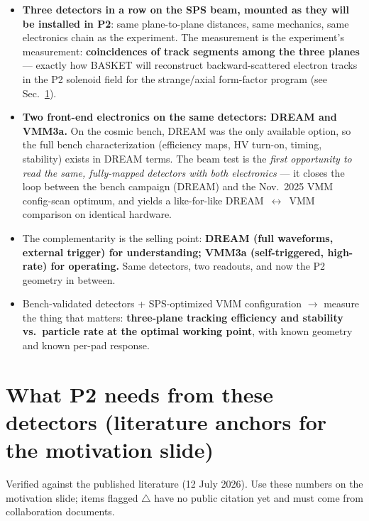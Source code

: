 \documentclass[11pt,a4paper]{article}
\begin{document}
\begin{itemize}[itemsep=2pt]
  \item \textbf{Three detectors in a row on the SPS beam, mounted as they will
    be installed in P2}: same plane-to-plane distances, same mechanics, same
    electronics chain as the experiment. The measurement is the experiment's
    measurement: \textbf{coincidences of track segments among the three
    planes} --- exactly how BASKET will reconstruct backward-scattered
    electron tracks in the P2 solenoid field for the strange/axial
    form-factor program (see Sec.~\ref{sec:p2needs}).
  \item \textbf{Two front-end electronics on the same detectors: DREAM and
    VMM3a.} On the cosmic bench, DREAM was the only available option, so the
    full bench characterization (efficiency maps, HV turn-on, timing,
    stability) exists in DREAM terms. The beam test is the \emph{first
    opportunity to read the same, fully-mapped detectors with both
    electronics} --- it closes the loop between the bench campaign (DREAM) and
    the Nov.\ 2025 VMM config-scan optimum, and yields a like-for-like
    DREAM~$\leftrightarrow$~VMM comparison on identical hardware.
  \item The complementarity is the selling point: \textbf{DREAM (full
    waveforms, external trigger) for understanding; VMM3a (self-triggered,
    high-rate) for operating.} Same detectors, two readouts, and now the P2
    geometry in between.
  \item Bench-validated detectors + SPS-optimized VMM configuration
    $\rightarrow$ measure the thing that matters: \textbf{three-plane tracking
    efficiency and stability vs.\ particle rate at the optimal working point},
    with known geometry and known per-pad response.
\end{itemize}

\section{What P2 needs from these detectors (literature anchors for the
  motivation slide)}
\label{sec:p2needs}

Verified against the published literature (12 July 2026). Use these numbers on
the motivation slide; items flagged $\triangle$ have no public citation yet
and must come from collaboration documents.
\end{document}
